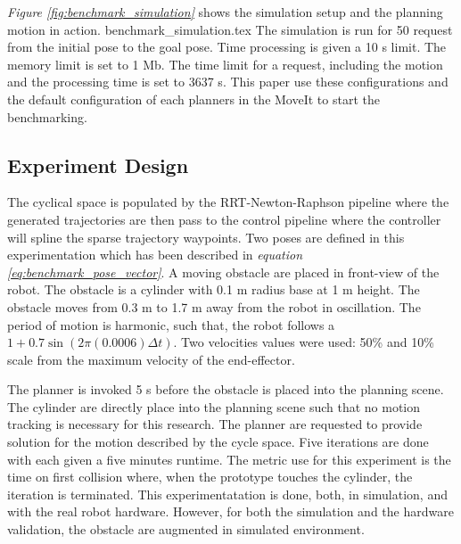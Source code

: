 \documentclass[a4paper, 10pt]{article}
\newcommand\thisPaperDir{/home/asl/version-control/ws_thesis/writing_papers/resampling_planning_in_dynamic_environment}
\numberwithin{equation}{section} %
\begin{document}
{\textit{Figure \ref{fig:benchmark_simulation}} shows the simulation 
setup and the planning motion in action. 
{benchmark_simulation.tex}
The simulation is run for 50 request from the initial pose to 
the goal pose. Time processing is given a 10 s limit. The memory limit
is set to 1 Mb. The time limit for a request, including the motion and the
processing time is set to 3637 s. This paper use these configurations and
the default configuration of each planners in the MoveIt to start the benchmarking. 
\subsection{Experiment Design}
The cyclical space is populated by the RRT-Newton-Raphson
pipeline where the generated trajectories are
then pass to the control pipeline where
the controller will spline the sparse trajectory
waypoints. Two poses are defined in this experimentation which
has been described in \textit{equation \ref{eq:benchmark_pose_vector}}.
A moving obstacle are placed in front-view of the robot. The obstacle
is a cylinder with 0.1 m radius base at 1 m height. 
The obstacle moves from 0.3 m to 1.7 m away from the robot
in oscillation. The period of motion is harmonic, such that, 
the robot follows a $1+0.7\sin(2\pi(0.0006)\Delta t)$. Two velocities 
values were used: 50\% and 10\% scale from the maximum velocity 
of the end-effector. 

The planner is invoked 5 s before the obstacle is placed 
into the planning scene. The cylinder
are directly place into the planning scene such that no motion 
tracking is necessary for this research. The planner are requested to
provide solution for the motion described by the cycle space. 
Five iterations are done with each given a five minutes runtime. The metric
use for this experiment is the time on first collision where,
when the prototype touches the cylinder, the iteration is terminated. 
This experimentatation
is done, both, in simulation, and with
the real robot hardware. However, for both the simulation and the hardware
validation, the obstacle are augmented in simulated environment.
}
\end{document}
